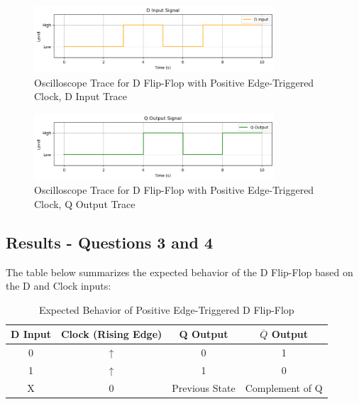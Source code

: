 \documentclass{article}
\begin{document}
    \begin{figure}[H]
        \centering
        \includegraphics[width=0.8\textwidth]{./img/Lab 11/11_3_2.png}  %
        \caption{Oscilloscope Trace for D Flip-Flop with Positive Edge-Triggered Clock, D Input Trace}
        \label{fig:D_FlipFlop_Oscilloscope_2}
    \end{figure}

    \begin{figure}[H]
        \centering
        \includegraphics[width=0.8\textwidth]{./img/Lab 11/11_3_3.png}  %
        \caption{Oscilloscope Trace for D Flip-Flop with Positive Edge-Triggered Clock, Q Output Trace}
        \label{fig:D_FlipFlop_Oscilloscope_3}
    \end{figure}

    \subsection*{\textbf{Results - Questions 3 and 4}}
    The table below summarizes the expected behavior of the D Flip-Flop based on the D and Clock inputs:

    \begin{table}[H]
        \centering
        \caption{Expected Behavior of Positive Edge-Triggered D Flip-Flop}
        \begin{tabular}{|c|c|c|c|}
            \hline
            D Input & Clock (Rising Edge) & Q Output & \(\overline{Q}\) Output \\
            \hline
            0 & ↑ & 0 & 1 \\
            1 & ↑ & 1 & 0 \\
            X & 0 & Previous State & Complement of Q \\
            \hline
        \end{tabular}
    \end{table}
\end{document}
